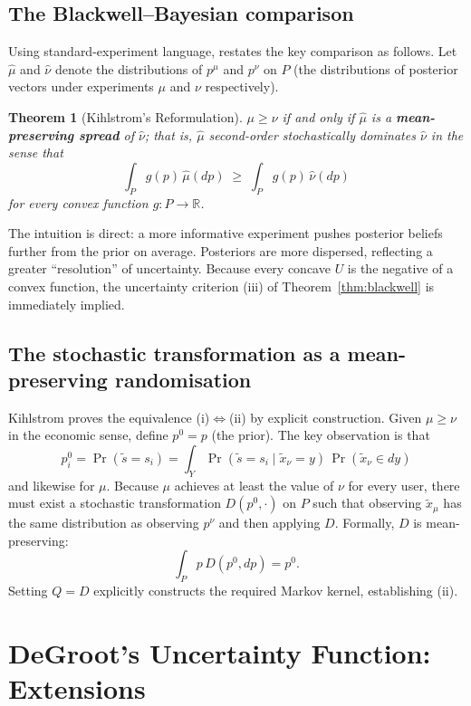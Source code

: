 \documentclass[12pt]{article}
\newtheorem{theorem}{Theorem}
\begin{document}
\subsection{The Blackwell--Bayesian comparison}

Using standard-experiment language, \citet{kihlstrom1984} restates the key
comparison as follows.  Let $\hat\mu$ and $\hat\nu$ denote the distributions
of $p^\mu$ and $p^\nu$ on $P$ (the distributions of posterior vectors under
experiments $\mu$ and $\nu$ respectively).

\begin{theorem}[Kihlstrom's Reformulation]
$\mu \geq \nu$ if and only if $\hat\mu$ is a \textbf{mean-preserving spread}
of $\hat\nu$; that is, $\hat\mu$ second-order stochastically dominates
$\hat\nu$ in the sense that
\[
\int_P g(p)\,\hat\mu(dp) \;\geq\; \int_P g(p)\,\hat\nu(dp)
\]
for every convex function $g: P \to \mathbb{R}$.
\end{theorem}

The intuition is direct: a more informative experiment pushes posterior
beliefs further from the prior on average.  Posteriors are more dispersed,
reflecting a greater ``resolution'' of uncertainty.  Because every concave
$U$ is the negative of a convex function, the uncertainty criterion (iii) of
Theorem~\ref{thm:blackwell} is immediately implied.

\subsection{The stochastic transformation as a mean-preserving randomisation}

Kihlstrom proves the equivalence (i)$\Leftrightarrow$(ii) by explicit
construction.  Given $\mu \geq \nu$ in the economic sense, define $p^0 = p$
(the prior).  The key observation is that
\[
p_i^0 = \Pr(\tilde{s} = s_i) = \int_Y \Pr(\tilde{s} = s_i \mid \tilde{x}_\nu = y)\,
\Pr(\tilde{x}_\nu \in dy)
\]
and likewise for $\mu$.  Because $\mu$ achieves at least the value of $\nu$
for every user, there must exist a stochastic transformation $D(p^0, \cdot)$
on $P$ such that observing $\tilde{x}_\mu$ has the same distribution as
observing $p^\nu$ and then applying $D$.  Formally, $D$ is mean-preserving:
\[
\int_P p\,D(p^0, dp) = p^0.
\]
Setting $Q = D$ explicitly constructs the required Markov kernel, establishing
(ii).

\section{DeGroot's Uncertainty Function: Extensions}
\end{document}

